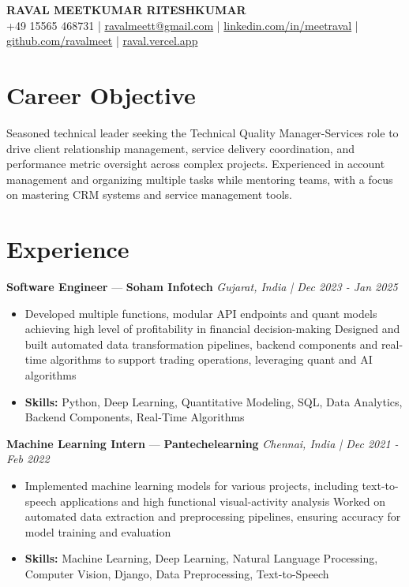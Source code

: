 \documentclass[a4paper,10pt]{article}
\begin{document}
\begin{center}
  {\Large\bfseries RAVAL MEETKUMAR RITESHKUMAR}\\[2pt]
  {\small +49 15565 468731 \;|\; \href{mailto:ravalmeett@gmail.com}{ravalmeett@gmail.com} \;|\; \href{https://www.linkedin.com/in/meetraval/}{linkedin.com/in/meetraval} \;|\; \href{https://github.com/ravalmeet}{github.com/ravalmeet} \;|\; \href{https://raval.vercel.app/}{raval.vercel.app}}
\end{center}
\vspace{-3pt}

\section*{Career Objective}
Seasoned technical leader seeking the Technical Quality Manager-Services role to drive client relationship management, service delivery coordination, and performance metric oversight across complex projects. Experienced in account management and organizing multiple tasks while mentoring teams, with a focus on mastering CRM systems and service management tools.\par

\section*{Experience}
\textbf{Software Engineer} — \textbf{Soham Infotech} \hfill \textit{Gujarat, India \;|\; Dec 2023 - Jan 2025}\par
\vspace{1pt}
\begin{itemize}
  \item Developed multiple functions, modular API endpoints and quant models achieving high level of profitability in financial decision-making Designed and built automated data transformation pipelines, backend components and real-time algorithms to support trading operations, leveraging quant and AI algorithms
  \item \textbf{Skills:} Python, Deep Learning, Quantitative Modeling, SQL, Data Analytics, Backend Components, Real-Time Algorithms
\end{itemize}
\vspace{3pt}
\textbf{Machine Learning Intern} — \textbf{Pantechelearning} \hfill \textit{Chennai, India \;|\; Dec 2021 - Feb 2022}\par
\vspace{1pt}
\begin{itemize}
  \item Implemented machine learning models for various projects, including text-to-speech applications and high functional visual-activity analysis Worked on automated data extraction and preprocessing pipelines, ensuring accuracy for model training and evaluation
  \item \textbf{Skills:} Machine Learning, Deep Learning, Natural Language Processing, Computer Vision, Django, Data Preprocessing, Text-to-Speech
\end{itemize}
\end{document}

